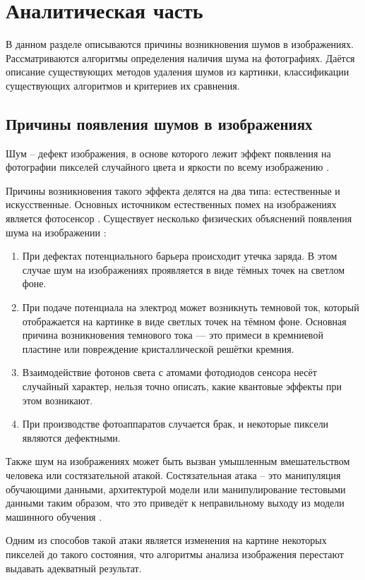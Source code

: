 \section{Аналитическая часть}
В данном разделе описываются причины возникновения шумов в изображениях. 
Рассматриваются алгоритмы определения наличия шума на фотографиях. 
Даётся описание существующих методов удаления шумов из картинки, классификации существующих алгоритмов и критериев их сравнения.

\subsection{Причины появления шумов в изображениях}
Шум -- дефект изображения, в основе которого лежит эффект появления на фотографии пикселей случайного цвета и яркости по всему изображению \cite{shum}. 

Причины возникновения такого эффекта делятся на два типа: естественные и искусственные.
Основных источником естественных помех на изображениях является фотосенсор \cite{shum}.
Существует несколько физических объяснений появления шума на изображении \cite{causes}:
\begin{enumerate}
	\item При дефектах потенциального барьера происходит утечка заряда. В этом случае шум на изображениях проявляется в виде тёмных точек на светлом фоне.
	\item При подаче потенциала на электрод может возникнуть темновой ток, который отображается на картинке в виде светлых точек на тёмном фоне. Основная причина возникновения темнового тока — это примеси в кремниевой пластине или повреждение кристаллической решётки кремния. 
	\item Взаимодействие фотонов света с атомами фотодиодов сенсора несёт случайный характер, нельзя точно описать, какие квантовые эффекты при этом возникают.
	\item При производстве фотоаппаратов случается брак, и некоторые пиксели являются дефектными. 
\end{enumerate}

Также шум на изображениях может быть вызван умышленным вмешательством человека или состязательной атакой. 
Состязательная атака – это манипуляция обучающими данными, архитектурой модели или манипулирование тестовыми данными таким
образом, что это приведёт к неправильному выходу из модели машинного обучения \cite{impact}.

Одним из способов такой атаки является изменения на картине некоторых пикселей до такого состояния, что алгоритмы анализа изображения перестают выдавать адекватный результат.


